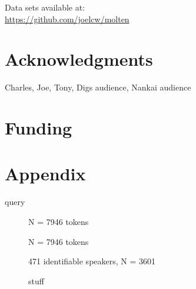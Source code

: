 \documentclass{artikel3}
\begin{document}
Data sets available at: \\
\url{https://github.com/joelcw/molten}\\


\section*{Acknowledgments}

Charles, Joe, Tony, Digs audience, Nankai audience


\section*{Funding}

\section*{Appendix}
query



%

%
  

\pagebreak 

\begin{figure}
    \begin{center}
    \caption{N =  7946 tokens}
       \label{molten1}
    \end{center}
\end{figure}

\begin{figure}
    \begin{center}
    \caption{N =  7946 tokens}
       \label{molten2}
    \end{center}
\end{figure}

\begin{figure}
    \begin{center}
    \caption{471 identifiable speakers, N = 3601}
       \label{molten3}
    \end{center}
\end{figure}

\begin{figure}
    \begin{center}
    \caption{stuff}
       \label{molten4}
    \end{center}
\end{figure}
\end{document}
